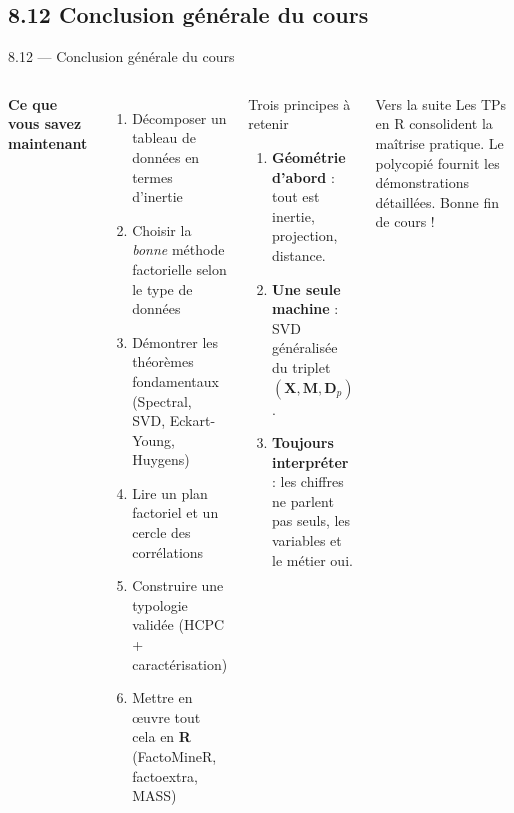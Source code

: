 \subsection{8.12 Conclusion générale du cours}
\begin{frame}{8.12 — Conclusion générale du cours}
\begin{columns}[T]
\textbf{Ce que vous savez maintenant}
\begin{enumerate}\small
  \item Décomposer un tableau de données en termes d'\alert{inertie}
  \item Choisir la \emph{bonne} méthode factorielle
        selon le type de données
  \item Démontrer les théorèmes fondamentaux
        (Spectral, SVD, Eckart-Young, Huygens)
  \item Lire un plan factoriel et un cercle des corrélations
  \item Construire une typologie validée
        (HCPC + caractérisation)
  \item Mettre en œuvre tout cela en \textbf{R}
        (FactoMineR, factoextra, MASS)
\end{enumerate}
\begin{block}{Trois principes à retenir}
\begin{enumerate}\small
  \item \textbf{Géométrie d'abord} : tout est inertie, projection, distance.
  \item \textbf{Une seule machine} : SVD généralisée du triplet
        $(\mathbf{X}, \mathbf{M}, \mathbf{D}_p)$.
  \item \textbf{Toujours interpréter} : les chiffres ne parlent pas seuls,
        les variables et le métier oui.
\end{enumerate}
\end{block}

\begin{alertblock}{Vers la suite}
\small Les TPs en R consolident la maîtrise pratique. Le polycopié
fournit les démonstrations détaillées. Bonne fin de cours !
\end{alertblock}
\end{columns}
\end{frame}
